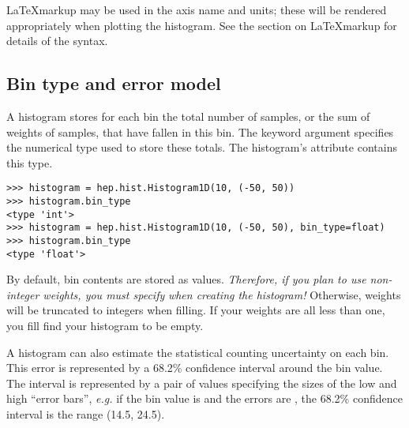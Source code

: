 \LaTeX markup may be used in the axis name and units; these will be
rendered appropriately when plotting the histogram.  See the section on
\LaTeX markup for details of the syntax.

\subsection{Bin type and error model}

A histogram stores for each bin the total number of samples, or the sum
of weights of samples, that have fallen in this bin.  The keyword
argument  specifies the numerical type used to store these
totals.  The histogram's  attribute contains this type.
\begin{verbatim}
>>> histogram = hep.hist.Histogram1D(10, (-50, 50))
>>> histogram.bin_type
<type 'int'>
>>> histogram = hep.hist.Histogram1D(10, (-50, 50), bin_type=float)
>>> histogram.bin_type
<type 'float'>
\end{verbatim}

By default, bin contents are stored as  values.
\emph{Therefore, if you plan to use non-integer weights, you must
specify}  \emph{when creating the histogram!}
Otherwise, weights will be truncated to integers when filling.  If your
weights are all less than one, you fill find your histogram to be empty.

A histogram can also estimate the statistical counting uncertainty on
each bin.  This error is represented by a 68.2\% confidence interval
around the bin value.  The interval is represented by a pair of values
specifying the sizes of the low and high ``error bars'',
\textit{e.g.} if the bin value is  and the errors are
, the 68.2\% confidence interval is the range (14.5,
24.5).

